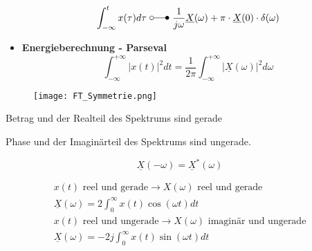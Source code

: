 \begin{mdframed}[style=exercise]
\begin{itemize}
		      \[
			      \int_{-\infty}^{t} x(\tau) d \tau\ \laplace\ \frac{1}{j \omega} \underline{X}(\omega)+\pi \cdot \underline{X}(0) \cdot \delta(\omega)
		      \]
		\item \textbf{Energieberechnung - Parseval}
		      \[
			      \int_{-\infty}^{+\infty}|x(t)|^{2} d t=\frac{1}{2 \pi} \int_{-\infty}^{+\infty}|\underline{X}(\omega)|^{2} d \omega
		      \]
	\end{itemize}
\end{mdframed}
\begin{mdframed}[style=exercise,frametitle=Symmetrie,nobreak=true]
	\begin{wrapfigure}[10]{R}{0.27\textwidth}
		\vspace{-1.4em}
		\texttt{[image: FT\_Symmetrie.png]}
	\end{wrapfigure}

	\begin{minipage}{5cm}
		Betrag und der Realteil des Spektrums sind gerade\\
	\end{minipage}

	\begin{minipage}{5cm}
		Phase und der Imaginärteil des Spektrums sind ungerade.
	\end{minipage}

	\[
		\underline{X}(-\omega) = \underline{X}^*(\omega)
	\]

	\begin{gather*}
		x(t)\text{ reel und gerade}\rightarrow X(\omega)\text{ reel und gerade}\\
		\underline{X}(\omega) = 2\int_0^\infty x(t)\cos(\omega t)dt\\
		x(t)\text{ reel und ungerade}\rightarrow X(\omega)\text{ imaginär und ungerade}\\
		\underline{X}(\omega) = -2j\int_0^\infty x(t)\sin(\omega t)dt
	\end{gather*}
\end{mdframed}
\clearpage
